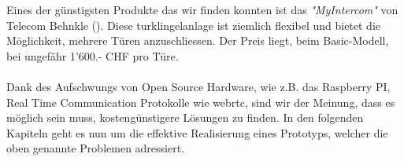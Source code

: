 Eines der günstigsten Produkte das wir finden konnten ist das \textit{"MyIntercom"} von Telecom Behnkle (). Diese \gls{turklingelanlage} ist ziemlich flexibel und bietet die Möglichkeit, mehrere Türen anzuschliessen. Der Preis liegt, beim Basic-Modell, bei ungefähr 1’600.- CHF pro Türe.
\\
\\
Dank des Aufschwungs von Open Source Hardware, wie z.B. das Raspberry PI, 
Real Time Communication Protokolle wie \gls{webrtc}, sind wir der Meinung, dass es möglich sein muss, kostengünstigere Lösungen zu finden.
In den folgenden Kapiteln geht es nun um die effektive Realisierung eines Prototyps, welcher die oben genannte Problemen adressiert.

\newpage